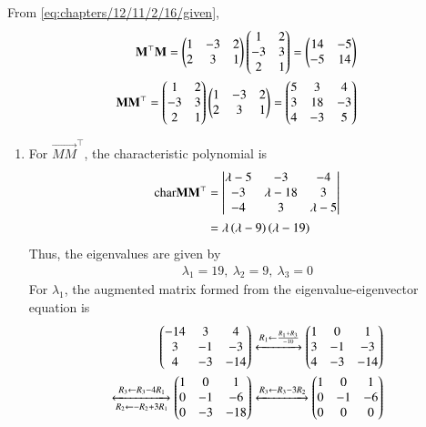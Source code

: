                 From \eqref{eq:chapters/12/11/2/16/given},
    \begin{align}
        \mathbf{M}^\top\mathbf{M} = \begin{pmatrix}1&-3&2\\2&3&1\end{pmatrix}\begin{pmatrix}1&2\\-3&3\\2&1\end{pmatrix} = \begin{pmatrix}14&-5\\-5&14\end{pmatrix} \\
        \mathbf{MM}^\top = \begin{pmatrix}1&2\\-3&3\\2&1\end{pmatrix}\begin{pmatrix}1&-3&2\\2&3&1\end{pmatrix} = \begin{pmatrix}5&3&4\\3&18&-3\\4&-3&5\end{pmatrix}
    \end{align}
    \begin{enumerate}
        \item For $\vec{MM}^\top$, the characteristic polynomial is
        \begin{align}
		\text{char}{\mathbf{MM}^\top} &= \begin{vmatrix}\lambda-5&-3&-4\\-3&\lambda-18&3\\-4&3&\lambda-5\end{vmatrix} \\
                                      &= \lambda\left(\lambda-9\right)\left(\lambda-19\right)
                                      \label{eq:chapters/12/11/2/16/svd/char-2}
        \end{align}
        Thus, the eigenvalues are given by
        \begin{align}
            \lambda_1 = 19,\ \lambda_2 = 9,\ \lambda_3 = 0
        \end{align}
        For $\lambda_1$, the augmented matrix formed from the 
        eigenvalue-eigenvector equation is
        \begin{align*}
            \myvec{-14&3&4\\3&-1&-3\\4&-3&-14} 
            \xleftrightarrow[]{R_1 \leftarrow \frac{R_1+R_3}{-10}} \myvec{1&0&1\\3&-1&-3\\4&-3&-14} \\
            \xleftrightarrow[R_2 \leftarrow -R_2+3R_1]{R_3 \leftarrow R_3-4R_1} \myvec{1&0&1\\0&-1&-6\\0&-3&-18} 
            \xleftrightarrow[]{R_3 \leftarrow R_3-3R_2} \myvec{1&0&1\\0&-1&-6\\0&0&0}

\end{align*}
\end{enumerate}
